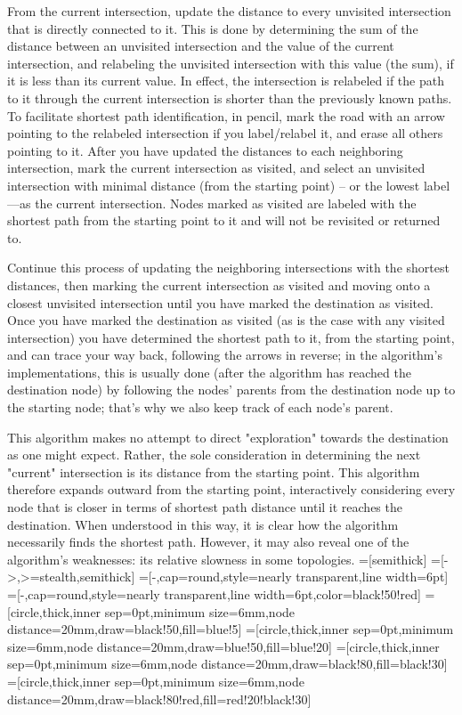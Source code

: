	From the current intersection, update the distance to every unvisited intersection that is directly connected to it. This is done by determining the sum of the distance between an unvisited intersection and the value of the current intersection, and relabeling the unvisited intersection with this value (the sum), if it is less than its current value. In effect, the intersection is relabeled if the path to it through the current intersection is shorter than the previously known paths. To facilitate shortest path identification, in pencil, mark the road with an arrow pointing to the relabeled intersection if you label/relabel it, and erase all others pointing to it. After you have updated the distances to each neighboring intersection, mark the current intersection as visited, and select an unvisited intersection with minimal distance (from the starting point) – or the lowest label—as the current intersection. Nodes marked as visited are labeled with the shortest path from the starting point to it and will not be revisited or returned to.

	Continue this process of updating the neighboring intersections with the shortest distances, then marking the current intersection as visited and moving onto a closest unvisited intersection until you have marked the destination as visited. Once you have marked the destination as visited (as is the case with any visited intersection) you have determined the shortest path to it, from the starting point, and can trace your way back, following the arrows in reverse; in the algorithm's implementations, this is usually done (after the algorithm has reached the destination node) by following the nodes' parents from the destination node up to the starting node; that's why we also keep track of each node's parent.

	This algorithm makes no attempt to direct "exploration" towards the destination as one might expect. Rather, the sole consideration in determining the next "current" intersection is its distance from the starting point. This algorithm therefore expands outward from the starting point, interactively considering every node that is closer in terms of shortest path distance until it reaches the destination. When understood in this way, it is clear how the algorithm necessarily finds the shortest path. However, it may also reveal one of the algorithm's weaknesses: its relative slowness in some topologies.
	=[semithick] %
	=[->,>=stealth,semithick] %
	=[-,cap=round,style=nearly transparent,line width=6pt] %
	=[-,cap=round,style=nearly transparent,line width=6pt,color=black!50!red]
	 =[circle,thick,inner sep=0pt,minimum size=6mm,node distance=20mm,draw=black!50,fill=blue!5]
	=[circle,thick,inner sep=0pt,minimum size=6mm,node distance=20mm,draw=blue!50,fill=blue!20]
	   =[circle,thick,inner sep=0pt,minimum size=6mm,node distance=20mm,draw=black!80,fill=black!30]
	  =[circle,thick,inner sep=0pt,minimum size=6mm,node distance=20mm,draw=black!80!red,fill=red!20!black!30]
	
